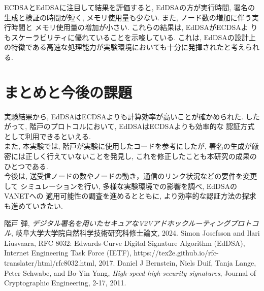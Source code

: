 \documentclass[a4j,9pt,twocolumn]{jsarticle}
\begin{document}
\vspace{-3mm}
  
\indent ECDSAとEdDSAに注目して結果を評価すると, 
EdDSAの方が実行時間, 署名の生成と検証の時間が短く, 
メモリ使用量も少ない. また, ノード数の増加に伴う実行時間と
メモリ使用量の増加が小さい. これらの結果は, EdDSAがECDSAよ
りもスケーラビリティに優れていることを示唆している. これは, 
EdDSAの設計上の特徴である高速な処理能力が実験環境においても十分に発揮されたと考えられる. 

\section{まとめと今後の課題}
\indent 実験結果から, EdDSAはECDSAよりも計算効率が高いことが確かめられた. 
したがって, 階戸のプロトコルにおいて, EdDSAはECDSAよりも効率的な
認証方式として利用できるといえる. \\
\indent また, 本実験では, 階戸が実験に使用したコードを参考にしたが, 
署名の生成が厳密には正しく行えていないことを発見し, 
これを修正したことも本研究の成果のひとつである. \\
\indent 今後は, 送受信ノードの数やノードの動き，通信のリンク状況などの要件を変更して
シミュレーションを行い, 多様な実験環境での影響を調べ, EdDSAのVANETへの
適用可能性の調査を進めるとともに, より効率的な認証方法の探求も進めていきたい. 


\noindent\hrulefill %
\begin{thebibliography}{99}
     階戸 弾,
        \textit{デジタル署名を用いたセキュアなV2Vアドホックルーティングプロトコル},
            岐阜大学大学院自然科学技術研究科修士論文, 2024.
     Simon Josefsson and Ilari Liusvaara, 
        RFC 8032: Edwards-Curve Digital Signature Algorithm (EdDSA),
        Internet Engineering Task Force (IETF), 
        https://tex2e.github.io/rfc-translater/html/rfc8032.html, 
        2017.
     Daniel J Bernstein, Niels Duif, Tanja Lange, Peter Schwabe, and Bo-Yin Yang,
        \textit{High-speed high-security signatures}, Journal of Cryptographic Engineering,
        2-17, 2011.
\end{thebibliography}

\end{document}
